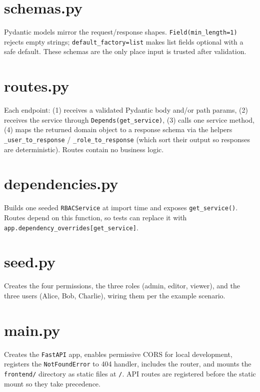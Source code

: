 \documentclass[11pt,a4paper]{report}
\begin{document}
\section{schemas.py}

Pydantic models mirror the request/response shapes. \texttt{Field(min\_length=1)}
rejects empty strings; \texttt{default\_factory=list} makes list fields optional
with a safe default. These schemas are the only place input is trusted after
validation.

\section{routes.py}

Each endpoint: (1) receives a validated Pydantic body and/or path params, (2)
receives the service through \texttt{Depends(get\_service)}, (3) calls one
service method, (4) maps the returned domain object to a response schema via the
helpers \texttt{\_user\_to\_response} / \texttt{\_role\_to\_response} (which sort
their output so responses are deterministic). Routes contain no business logic.

\section{dependencies.py}

Builds one seeded \texttt{RBACService} at import time and exposes
\texttt{get\_service()}. Routes depend on this function, so tests can replace it
with \texttt{app.dependency\_overrides[get\_service]}.

\section{seed.py}

Creates the four permissions, the three roles (admin, editor, viewer), and the
three users (Alice, Bob, Charlie), wiring them per the example scenario.

\section{main.py}

Creates the \texttt{FastAPI} app, enables permissive CORS for local development,
registers the \texttt{NotFoundError} to 404 handler, includes the router, and
mounts the \texttt{frontend/} directory as static files at \texttt{/}. API
routes are registered before the static mount so they take precedence.
\end{document}
